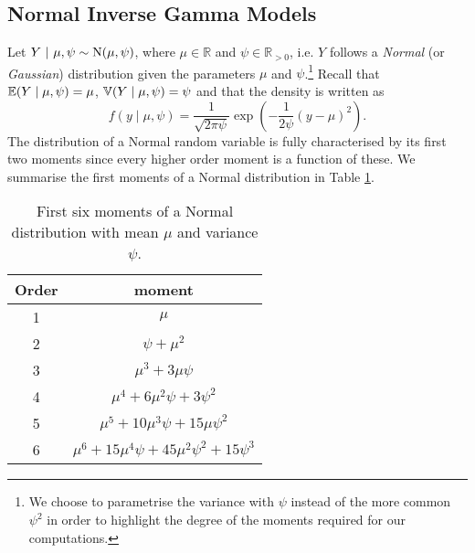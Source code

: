 \subsection{Normal Inverse Gamma Models }
\label{sec:nig}
Let $Y~|~\mu,\psi\sim \textnormal{N}(\mu,\psi)$, where $\mu\in\mathbb{R}$ and $\psi\in\mathbb{R}_{>0}$, i.e. $Y$ follows a \textit{Normal} (or \textit{Gaussian}) distribution given the parameters $\mu$ and $\psi$.\footnote{We choose to parametrise the variance with $\psi$ instead of the more common $\psi^2$ in order to highlight the degree of the moments required for our computations.} Recall that $\mathbb{E}(Y\;|\;\mu,\psi)=\mu$, $\mathbb{V}(Y\;|\;\mu,\psi)=\psi$ and that the density is written as
\begin{equation}
\label{eq:normaldensity}
f(y\;|\;\mu,\psi)=\frac{1}{\sqrt{2\pi\psi}}\exp\left(-\frac{1}{2\psi}(y-\mu)^2\right).
\end{equation} 
The distribution of a Normal random variable is fully characterised by its first two moments since every higher order moment is a function of these. We summarise the first moments of a Normal distribution in Table \ref{table:moments}.

\begin{table}
\renewcommand{\arraystretch}{1.5}
\begin{center}
\begin{tabular}{|c|c|}
\hline
Order& moment  \\
\hline
1&$\mu$\\
\hline
2&$\psi+\mu^2$\\
\hline
3&$\mu^3+3\mu\psi$\\
\hline
4&$\mu^4+6\mu^2\psi+3\psi^2$\\
\hline
5&$\mu^5+10\mu^3\psi+15\mu\psi^2$\\
\hline
6&$\mu^6+15\mu^4\psi+45\mu^2\psi^2+15\psi^3$\\
\hline
\end{tabular}
\end{center}
\caption{First six moments of a Normal distribution with mean $\mu$ and variance $\psi$.\label{table:moments}}
\end{table} 

